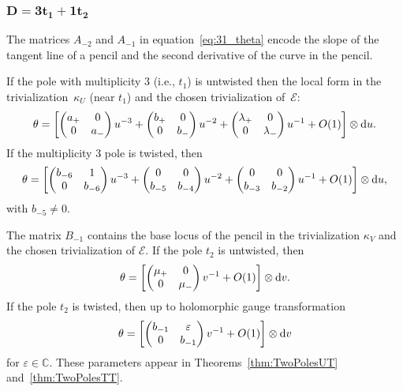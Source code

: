 \documentclass[10pt,a4paper]{amsart}
\newcommand{\C}{{\mathbb C}} %
\newcommand{\E}{{\mathcal E}} %
\renewcommand{\t}{\theta} %
\renewcommand{\d}{{\rm d}} %
\numberwithin{equation}{section}
\begin{document}
\subsubsection[$D=3t_1+1t_2$]{$\boldsymbol{D=3t_1+1t_2}$}\label{sssec:31}
The matrices $A_{-2}$ and $A_{-1}$ in equation~\eqref{eq:31_theta}
encode the slope of the tangent line of a pencil and the second
derivative of the curve in the pencil.

If the pole with multiplicity $3$ (i.e., $t_1$) is untwisted then the local form
in the trivializa\-tion~$\kappa_U$ (near $t_1$) and the chosen trivialization of~$\E$:
\begin{gather*}
 \t = \left[ \begin{pmatrix}
 a_+ & 0 \\
 0 & a_-
 \end{pmatrix} u^{-3}
				+
				\begin{pmatrix}
 b_+ & 0 \\
 0 & b_-
 \end{pmatrix} u^{-2}
				+
				\begin{pmatrix}
 \lambda_+ & 0 \\
 0 & \lambda_-
 \end{pmatrix} u^{-1}
				+ O(1)
 \right] \otimes \d u.
\end{gather*}
If the multiplicity $3$ pole is twisted, then
\begin{gather*}
 \t = \left[ \begin{pmatrix}
 b_{-6} & 1 \\
 0	& b_{-6}
 \end{pmatrix} u^{-3}
 +
 \begin{pmatrix}
 0 & 0 \\
 b_{-5} & b_{-4}
 \end{pmatrix} u^{-2}
 +
 \begin{pmatrix}
 0 & 0 \\
 b_{-3} & b_{-2}
 \end{pmatrix} u^{-1}
 + O(1)
 \right] \otimes \d u,
\end{gather*}
{with $b_{-5} \neq 0$.}

The matrix $B_{-1}$ contains the base locus of the pencil in the
trivialization $\kappa_V$ and the chosen trivialization of $\E$. If the pole $t_2$ is untwisted, then
\begin{gather*}
 \t = \left[ \begin{pmatrix}
 \mu_+ & 0 \\
 0 & \mu_-
 \end{pmatrix} v^{-1} + O(1)
 \right] \otimes \d v.
 \end{gather*}
If the pole $t_2$ is twisted, then up to holomorphic gauge transformation
\begin{gather*}
 \t = \left[ \begin{pmatrix}
 b_{-1} & \varepsilon \\
 0	& b_{-1}
 \end{pmatrix} v^{-1}
 + O(1)
 \right] \otimes \d v
\end{gather*}
for $\varepsilon \in \C$.
These parameters appear in Theorems~\ref{thm:TwoPolesUT} and~\ref{thm:TwoPolesTT}.
\end{document}
